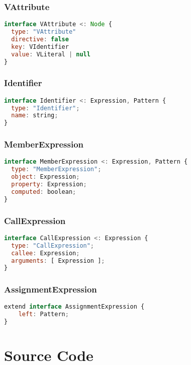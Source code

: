 \subsubsection{VAttribute}
\label{eslint:VAttribute}
\begin{lstlisting}[language=JavaScript]
interface VAttribute <: Node {
  type: "VAttribute"
  directive: false
  key: VIdentifier
  value: VLiteral | null
}
\end{lstlisting}

\subsubsection{Identifier}
\label{eslint:identifier}
\begin{lstlisting}[language=JavaScript]
interface Identifier <: Expression, Pattern {
  type: "Identifier";
  name: string;
}
\end{lstlisting}

\subsubsection{MemberExpression}
\label{eslint:member_expression}
\begin{lstlisting}[language=JavaScript]
interface MemberExpression <: Expression, Pattern {
  type: "MemberExpression";
  object: Expression;
  property: Expression;
  computed: boolean;
} 
\end{lstlisting}

\subsubsection{CallExpression}
\label{eslint:call_expression}

\begin{lstlisting}[language=JavaScript]
interface CallExpression <: Expression {
  type: "CallExpression";
  callee: Expression;
  arguments: [ Expression ];
}
\end{lstlisting}

\subsubsection{AssignmentExpression}
\label{eslint:AssignmentExpression}
\begin{lstlisting}[language=JavaScript]
extend interface AssignmentExpression {
    left: Pattern;
}
\end{lstlisting}


\section{Source Code}
